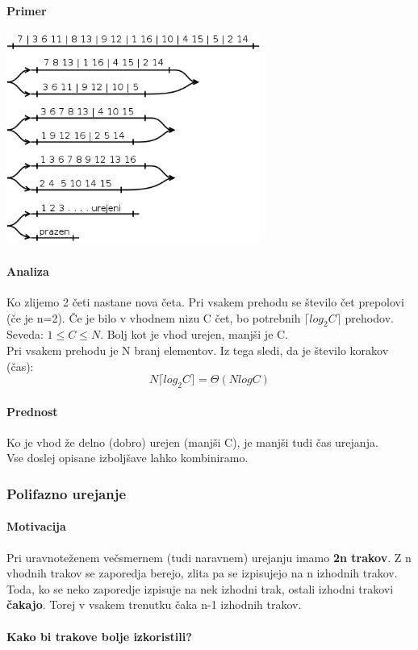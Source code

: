 \documentclass[a4paper,10pt]{article}
\begin{document}
\paragraph{Primer}
	\begin{center}
	\includegraphics[width=8.3cm,height=6.9cm]{Slike/NaravnoZlivanjePrimer.png}
	\end{center}

\paragraph{Analiza}
Ko zlijemo 2 \v ceti nastane nova \v ceta. Pri vsakem prehodu se \v stevilo \v cet prepolovi (\v ce je n=2). \v Ce je bilo v vhodnem nizu C \v cet, bo potrebnih $\lceil log_2C \rceil$ prehodov.\\
Seveda: $1 \leq C \leq N$. Bolj kot je vhod urejen, manj\v si je C.\\
Pri vsakem prehodu je N branj elementov. Iz tega sledi, da je \v stevilo korakov (\v cas):
$$
N \lceil log_2C \rceil = \Theta (N log C)
$$

\paragraph{Prednost}
Ko je vhod \v ze delno (dobro) urejen (manj\v si C), je manj\v si tudi \v cas urejanja.\\
Vse doslej opisane izbolj\v save lahko kombiniramo.

\subsubsection{Polifazno urejanje}

\paragraph{Motivacija}
Pri uravnote\v zenem ve\v csmernem (tudi naravnem) urejanju imamo \textbf{2n trakov}. Z n vhodnih trakov se zaporedja berejo, zlita pa se izpisujejo na n izhodnih trakov.\\
Toda, ko se neko zaporedje izpisuje na nek izhodni trak, ostali izhodni trakovi \textbf{\v cakajo}. Torej v vsakem trenutku \v caka n-1 izhodnih trakov.\\
\\
\textbf{Kako bi trakove bolje izkoristili?}
\end{document}
